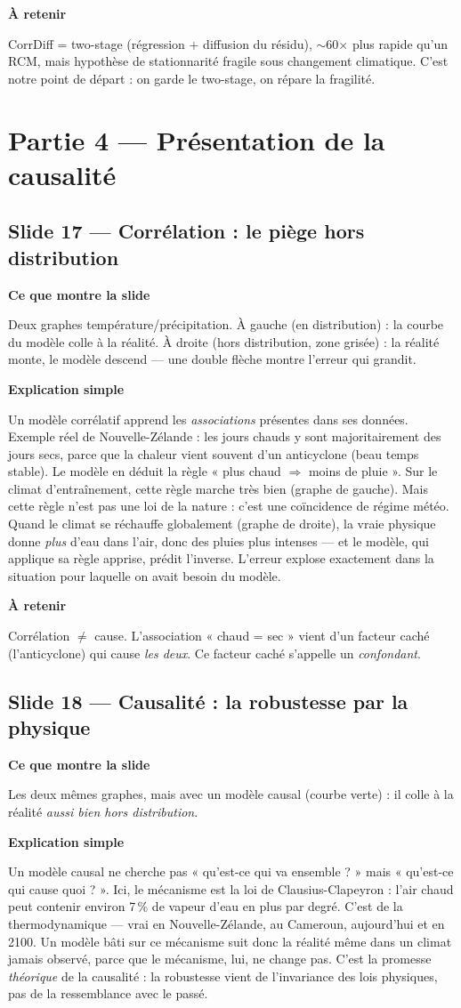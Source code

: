 \documentclass[11pt,a4paper]{article}
\newcommand{\slide}[2]{\subsection*{\textcolor{bleu}{Slide #1 --- #2}}}
\newcommand{\bloc}[1]{\par\medskip\noindent\textcolor{accent}{\textbf{#1}}\par\nopagebreak\smallskip}
\begin{document}
\bloc{À retenir}
CorrDiff = two-stage (régression + diffusion du résidu), $\sim$60$\times$ plus rapide qu'un RCM, mais hypothèse de stationnarité fragile sous changement climatique. C'est notre point de départ : on garde le two-stage, on répare la fragilité.

\section{Partie 4 --- Présentation de la causalité}

\slide{17}{Corrélation : le piège hors distribution}

\bloc{Ce que montre la slide}
Deux graphes température/précipitation. À gauche (en distribution) : la courbe du modèle colle à la réalité. À droite (hors distribution, zone grisée) : la réalité monte, le modèle descend --- une double flèche montre l'erreur qui grandit.

\bloc{Explication simple}
Un modèle corrélatif apprend les \emph{associations} présentes dans ses données. Exemple réel de Nouvelle-Zélande : les jours chauds y sont majoritairement des jours secs, parce que la chaleur vient souvent d'un anticyclone (beau temps stable). Le modèle en déduit la règle « plus chaud $\Rightarrow$ moins de pluie ». Sur le climat d'entraînement, cette règle marche très bien (graphe de gauche). Mais cette règle n'est pas une loi de la nature : c'est une coïncidence de régime météo. Quand le climat se réchauffe globalement (graphe de droite), la vraie physique donne \emph{plus} d'eau dans l'air, donc des pluies plus intenses --- et le modèle, qui applique sa règle apprise, prédit l'inverse. L'erreur explose exactement dans la situation pour laquelle on avait besoin du modèle.

\bloc{À retenir}
Corrélation $\ne$ cause. L'association « chaud = sec » vient d'un facteur caché (l'anticyclone) qui cause \emph{les deux}. Ce facteur caché s'appelle un \emph{confondant}.

\slide{18}{Causalité : la robustesse par la physique}

\bloc{Ce que montre la slide}
Les deux mêmes graphes, mais avec un modèle causal (courbe verte) : il colle à la réalité \emph{aussi bien hors distribution}.

\bloc{Explication simple}
Un modèle causal ne cherche pas « qu'est-ce qui va ensemble ? » mais « qu'est-ce qui cause quoi ? ». Ici, le mécanisme est la loi de Clausius-Clapeyron : l'air chaud peut contenir environ 7\,\% de vapeur d'eau en plus par degré. C'est de la thermodynamique --- vrai en Nouvelle-Zélande, au Cameroun, aujourd'hui et en 2100. Un modèle bâti sur ce mécanisme suit donc la réalité même dans un climat jamais observé, parce que le mécanisme, lui, ne change pas. C'est la promesse \emph{théorique} de la causalité : la robustesse vient de l'invariance des lois physiques, pas de la ressemblance avec le passé.
\end{document}
